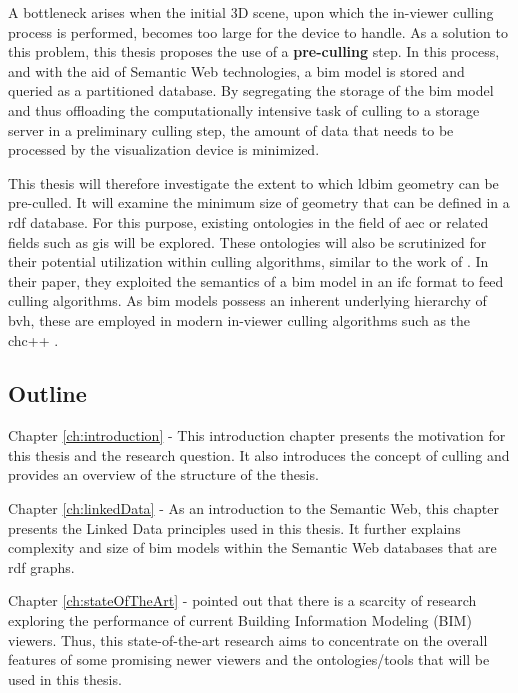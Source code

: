 \begin{refsection}
\begin{multicols}{2}
        A bottleneck arises when the initial 3D scene, upon which the in-viewer culling process is performed, becomes too large for the device to handle. As a solution to this problem, this thesis proposes the use of a \textbf{pre-culling} step. In this process, and with the aid of Semantic Web technologies, a \ac{bim} model is stored and queried as a partitioned database. By segregating the storage of the \ac{bim} model and thus offloading the computationally intensive task of culling to a storage server in a preliminary culling step, the amount of data that needs to be processed by the visualization device is minimized.


        This thesis will therefore investigate the extent to which \ac{ldbim} geometry can be pre-culled. It will examine the minimum size of geometry that can be defined in a \ac{rdf} database. For this purpose, existing ontologies in the field of \ac{aec} or related fields such as \ac{gis} will be explored. These ontologies will also be scrutinized for their potential utilization within culling algorithms, similar to the work of \cite{Johansson2009}. In their paper, they exploited the semantics of a \ac{bim} model in an \ac{ifc} format to feed culling algorithms. As \ac{bim} models possess an inherent underlying hierarchy of \ac{bvh}, these are employed in modern in-viewer culling algorithms such as the \ac{chc}++ \parencite{Johansson2015}.

        \subsection*{Outline}
        \textsf{Chapter \ref{ch:introduction} -}
        This introduction chapter presents the motivation for this thesis and the research question. It also introduces the concept of culling and provides an overview of the structure of the thesis.

        \textsf{Chapter \ref{ch:linkedData} -}
        As an introduction to the Semantic Web, this chapter presents the Linked Data principles used in this thesis. It further explains complexity and size of \ac{bim} models within the Semantic Web databases that are \ac{rdf} graphs.

        \textsf{Chapter \ref{ch:stateOfTheArt} -}
        \cite{Johansson2015} pointed out that there is a scarcity of research exploring the performance of current Building Information Modeling (BIM) viewers. Thus, this state-of-the-art research aims to concentrate on the overall features of some promising newer viewers and the ontologies/tools
        that will be used in this thesis. 
        

\end{multicols}
\end{refsection}
